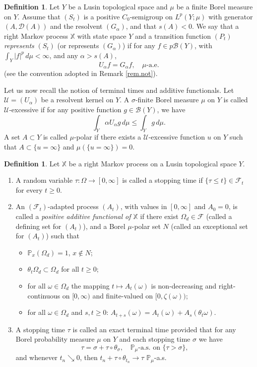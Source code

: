 \documentclass[11pt,a4paper,reqno]{amsart}
\theoremstyle{definition}
\newtheorem{definition}[theorem]{Definition}
\numberwithin{equation}{section}
\begin{document}
\begin{definition}
\label{def.rep}
Let $Y$ be a Lusin topological space and $\mu$ be a finite Borel measure on $Y$. Assume that $(S_t)$
is a positive $C_0$-semigroup on $L^p(Y;\mu)$ with generator $(A,\mathscr D(A))$ 
and the resolvent $(G_\alpha)$, and that  $s(A)<0$. 
We say that a right Markov process $\mathbb X$ with state space $Y$ and a transition function $(P_t)$
{\em represents } $(S_t)$ (or represents $(G_\alpha)$) if for any  $f\in p\mathcal B(Y)$, with $\int_Y|f|^p\,d\mu<\infty$,
and any $\alpha>s(A)$,
\begin{equation}
\label{eq.equiv123}
U_\alpha f=G_\alpha f,\quad \mu\text{-a.e.}
\end{equation}
(see the convention adopted in Remark \ref{rem.not}).
\end{definition}
Let us now recall the notion of terminal  times and additive functionals.  
Let $\mathcal U=(U_\alpha)$ be a resolvent kernel on $Y$.
A $\sigma$-finite Borel measure $\mu$ on $Y$
is called $\mathcal U$-excessive if for any positive function $g\in \mathcal B(Y)$, we have 
\[
\int_Y\alpha U_\alpha g\,d\mu\le \int_Y g\,d\mu.
\]
A set $A\subset Y$ is called $\mu$-polar if there exists a $\mathcal U$-excessive function $u$ on 
$Y$ such that $A\subset \{u=\infty\}$ and $\mu(\{u=\infty\})=0$.



\begin{definition} 
Let $\mathbb X$ be a right Markov process on a Lusin topological space $Y$.
\begin{enumerate}
\item[(i)] A random variable $\tau:\Omega\to [0,\infty]$ is called a stopping time if $\{\tau\le t\}\in \mathcal F_t$ for every $t\ge 0$.
\item[(ii)]
An   $(\mathcal F_t)$-adapted  process $(A_t)$,  with values in $[0,\infty]$ 
and $A_0=0$, is called a {\em positive  additive functional of $\mathbb X$} 
if  there exist  $\Omega_d \in \mathcal{F}$ (called a defining set for $(A_t)$), and a Borel 
$\mu$-polar set $N$ (called an exceptional set for $(A_t)$) such that
\begin{itemize}
\item $\mathbb{P}_x(\Omega_d)=1$,  $x \notin N$;
\item $\theta_t \Omega_d \subset \Omega_d$ for all $t \geq 0$;
\item for all $\omega \in \Omega_d$ the mapping $t \mapsto A_t(\omega)$ 
is non-decreasing and right-continuous on $[0, \infty)$ and finite-valued on $[0, \zeta(\omega))$;
\item for all $\omega \in \Omega_d$ and $s, t \geq 0$: $A_{t+s}(\omega)=A_t(\omega)+A_s\left(\theta_t \omega\right)$.
\end{itemize}
\item[(iii)] A stopping time $\tau$ is called an exact  terminal time provided that
for any  Borel probability  measure $\mu$ on $Y$ and each stopping time $\sigma$
we have 
\[
\tau=\sigma+\tau \circ \theta_{\sigma},\quad \mathbb P_\mu\text{-a.s. on } \{\tau>\sigma\},
\]
and whenever $t_n\searrow 0$, then $t_n+\tau\circ \theta_{t_n}\to \tau$ $\mathbb P_\mu$-a.s.
\end{enumerate}
\end{definition}
\end{document}
